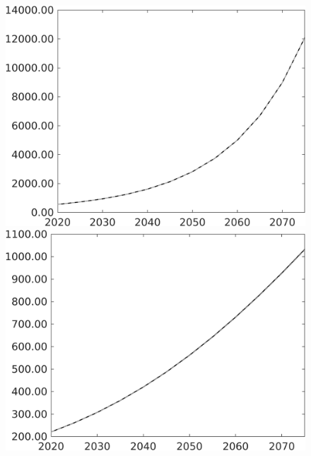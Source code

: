\documentclass[12pt]{article}
\begin{document}
\begin{figure}[h!!]
\begin{minipage}[]{0.32\textwidth}
\end{minipage}	
\begin{minipage}[]{0.32\textwidth}
\includegraphics[width=1\textwidth]{../../codding_model/own_basedOnFried/optimalPol_010922_revision/figures/all_13Sept22/PerdifNoTauf_Equlab_regime0_CompTaul_LgLf_spillover0_nsk0_xgr1_knspil1_sep1_LFlimit0_emsbase0_countec0_GovRev0_etaa0.79_lgd0.png}
\end{minipage}	
\begin{minipage}[]{0.32\textwidth}
\includegraphics[width=1\textwidth]{../../codding_model/own_basedOnFried/optimalPol_010922_revision/figures/all_13Sept22/PerdifNoTauf_Equlab_regime0_CompTaul_Lg_spillover0_nsk0_xgr1_knspil1_sep1_LFlimit0_emsbase0_countec0_GovRev0_etaa0.79_lgd0.png}

\end{minipage}
\end{figure}
\end{document}
